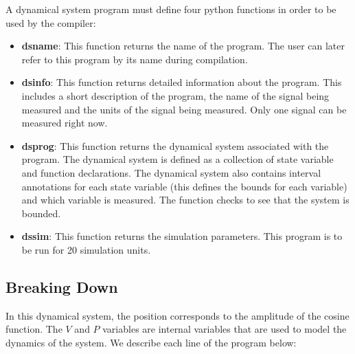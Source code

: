 \noindent A dynamical system program must define four python functions in order to be used
by the compiler:

\begin{itemize}
\item\textbf{dsname}: This function returns the name of the program. The user
  can later refer to this program by its name during compilation.
\item\textbf{dsinfo}: This function returns detailed information about the
  program. This includes a short description of the program, the name of the
  signal being measured and the units of the signal being measured. Only one
  signal can be measured right now.
\item\textbf{dsprog}: This function returns the dynamical system associated
  with the program. The dynamical system is defined as a collection of state variable and
  function declarations. The dynamical system also contains interval annotations
  for each state variable (this defines the bounds for each variable) and which
  variable is measured. The  function checks to see that the system
  is bounded. 
  \item\textbf{dssim}: This function returns the simulation parameters. This
    program is to be run for 20 simulation units.  
\end{itemize}

\subsection{Breaking Down }
In this dynamical system, the position  corresponds to the amplitude of
the cosine function. The $V$ and $P$ variables are internal variables that are
used to model the dynamics of the system. We describe each line of the program
below:

